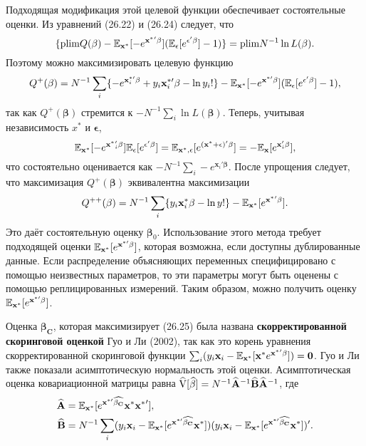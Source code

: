 Подходящая модификация этой целевой функции обеспечивает состоятельные оценки. Из уравнений (26.22) и (26.24) следует, что
\[
\{ \mathrm{plim } Q(\mathbf{\beta})-\mathbb{E}_{\mathbf{x^*}} [-e^{\mathbf{x^*}' \mathbf{\beta}}](\mathbb{E}_{\epsilon}[e^{\mathbf{\epsilon}' \mathbf{\beta}}]-1) \} = \mathrm{plim } N^{-1}\ln L(\mathbf{\beta}).
\]
Поэтому можно максимизировать целевую функцию
\[
Q^+(\mathbf{\beta})=N^{-1} \sum \limits_i \{ -e^{\mathbf{x}^{*\prime}_i \mathbf{\beta}} + y_i \mathbf{x}^{*\prime}_i \mathbf{\beta} - \ln y_i! \} - \mathbb{E}_{\mathbf{x^*}} [-e^{\mathbf{x^{*\prime}} \mathbf{\beta}}](\mathbb{E}_{\epsilon}[e^{\mathbf{\epsilon}' \mathbf{\beta}}]-1),
\]
так как $Q^+(\mathbf{\beta})$ стремится к $-N^{-1} \sum \limits_i \ln L(\mathbf{\beta})$. Теперь, учитывая независимость $x^*$ и $\mathbf{\epsilon}$,
\[
\mathbb{E}_{\mathbf{x^*}}[ -e^{\mathbf{x^*}'_i \mathbf{\beta}}]\mathbb{E}_{\epsilon}[e^{\mathbf{\epsilon}' \mathbf{\beta}}] = \mathbb{E}_{\mathbf{x^*},\epsilon}[e^{(\mathbf{x^*}+\mathbf{\epsilon})' \mathbf{\beta}}]=-\mathbb{E}_{\mathbf{x}}[e^{\mathbf{x}'_i \mathbf{\beta}}],
\]
что состоятельно оценивается как $-N^{-1} \sum \limits_i -e^{\mathbf{x}_i' \mathbf{\beta}}$. После  упрощения следует, что максимизация $Q^+(\mathbf{\beta})$ эквивалентна максимизации
\begin{equation}
Q^{++}(\mathbf{\beta})=N^{-1} \sum \limits_i \{ y_i \mathbf{x}^*_i \mathbf{\beta} - \ln y! \} - \mathbb{E}_{\mathbf{x^*}} [e^{\mathbf{x^*}' \mathbf{\beta}}].
\end{equation}
Это даёт состоятельную оценку $\mathbf{\beta}_0$. Использование этого метода требует подходящей оценки $\mathbb{E}_{\mathbf{x}^*}[ e^{\mathbf{x}^{*\prime} \mathbf{\beta}}]$, которая возможна, если доступны дублированные данные. Если распределение объясняющих переменных специфицировано с помощью неизвестных параметров, то эти параметры могут быть оценены с помощью реплицированных измерений. Таким образом, можно получить оценку $\mathbb{E}_{\mathbf{x}^*}[ e^{\mathbf{x}^{*\prime} \mathbf{\beta}}]$.

Оценка $\mathbf{\beta_C}$, которая максимизирует (26.25) была названа {\bf скорректированной скоринговой оценкой} Гуо и Ли (2002), так как это корень уравнения  скорректированной скоринговой функции $\sum_i (y_i \mathbf{x}_i- \mathbb{E}_{\mathbf{x^*}}[\mathbf{x^*}e^{\mathbf{x^*}'\mathbf{\beta}}])=\mathbf{0}$. Гуо и Ли также показали асимптотическую нормальность этой оценки. Асимптотическая оценка ковариационной матрицы равна $\widehat{\mathrm{V}}[\widehat{\mathbf{\beta}}]=N^{-1} \widehat{\mathbf{A}}^{-1}\widehat{\mathbf{B}}\widehat{\mathbf{A}}^{-1}$, где 
\begin{align*}
\widehat{\mathbf{A}}&=\mathbb{E}_{\mathbf{x^*}}[e^{\mathbf{x}^{*\prime} \widehat{\mathbf{\beta_C}}} \mathbf{x^*} \mathbf{x^*}'], \\
\widehat{\mathbf{B}}&=N^{-1} \sum \limits_i (y_i \mathbf{x}_i - \mathbb{E}_{\mathbf{x^*}}[e^{\mathbf{x}^{*\prime} \widehat{\mathbf{\beta_C}}} \mathbf{x^*}]) (y_i \mathbf{x}_i - \mathbb{E}_{\mathbf{x^*}}[e^{\mathbf{x}^{*\prime} \widehat{\mathbf{\beta_C}}} \mathbf{x^*}])'.
\end{align*}

